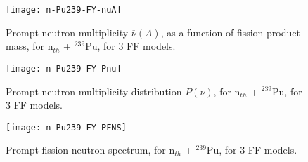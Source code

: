 \begin{figure}
\centering\texttt{[image: n-Pu239-FY-nuA]}
\caption{Prompt neutron multiplicity $\overline{\nu}(A)$, as a function of fission product mass, for n$_{th}$ + $^{239}$Pu, for 3 FF models.}
\label{n-Pu239-FY-nuA}
\end{figure}
\begin{figure}
\centering\texttt{[image: n-Pu239-FY-Pnu]}
\caption{Prompt neutron multiplicity distribution $P(\nu )$, for n$_{th}$ + $^{239}$Pu, for 3 FF models.}
\label{n-Pu239-FY-Pnu}
\end{figure}
\begin{figure}
\centering\texttt{[image: n-Pu239-FY-PFNS]}
\caption{Prompt fission neutron spectrum, for n$_{th}$ + $^{239}$Pu, for 3 FF models.}
\label{n-Pu239-FY-PFNS}
\end{figure}
